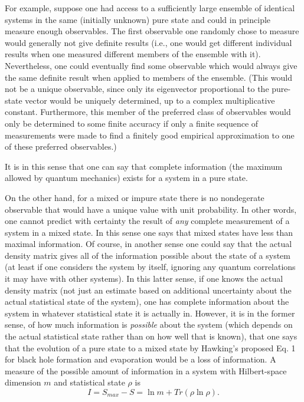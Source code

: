 \documentclass[12pt]{article}
\begin{document}
     For example, suppose one had
access to a sufficiently large ensemble of identical systems in the
same
(initially
unknown) pure state and could in principle measure enough
observables.  The
first observable one randomly chose to measure would generally not
give
definite results (i.e., one would get different individual results
when one
measured different members of the ensemble with it).  Nevertheless,
one could
eventually find some observable which would always give the same
definite
result when applied to members of the ensemble.  (This would not be a
unique
observable, since only its eigenvector proportional to the pure-state
vector
would be uniquely determined, up to a complex multiplicative
constant.
Furthermore, this member of the preferred class of observables would
only
be determined to some finite accuracy if
only a finite sequence of measurements were made to find a finitely
good
empirical approximation to one of these preferred observables.)

    It is in this sense that
one can say that complete information (the maximum allowed by quantum
mechanics) exists for a system in a pure state.

     On the other hand, for a mixed or impure state there is no
nondegerate
observable that would have a unique value with unit probability.  In
other
words, one cannot predict with certainty the result of {\it any}
complete
measurement of a system in a mixed state.  In this sense one says
that mixed
states have less than maximal information.  Of course, in another
sense one
could say that the actual density matrix gives all of the information
possible
about the state of a system (at least if one considers the system by
itself,
ignoring any quantum correlations it may have with other systems).
In this
latter sense, if one knows the actual density matrix (not just an
estimate
based on additional uncertainty about the actual statistical state of
the
system), one has complete information about the system in whatever
statistical
state it is actually in.  However, it is in the former sense, of how
much
information is {\it possible} about the system (which depends on the
actual
statistical state rather than on how well that is known), that one
says that
the evolution of a pure state to a mixed state by Hawking's proposed
Eq. 1 for
black hole formation and evaporation would be a loss of information.
A measure
of the possible amount of information in a system with Hilbert-space
dimension
$m$ and statistical state $\rho$ is
     	\begin{equation}
	I = S_{max} - S=\ln m + Tr(\rho\ln\rho).
	\end{equation}
\end{document}
